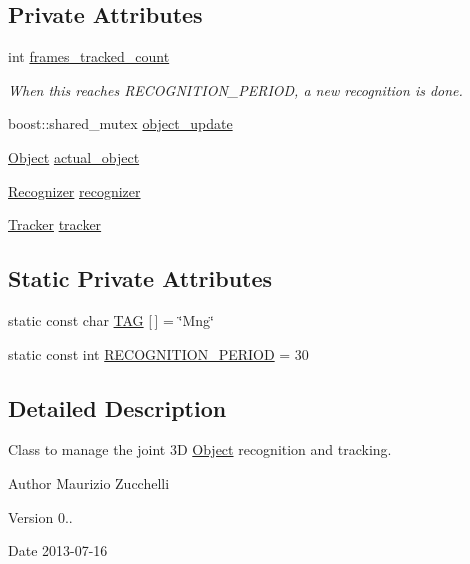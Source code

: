 \subsection*{Private Attributes}
\begin{DoxyCompactItemize}
\item 
int \hyperlink{class_i_stuff_1_1_manager_a3cacb02ece1a4938e7754ad553c91a74}{frames\-\_\-tracked\-\_\-count}
\begin{DoxyCompactList}\small\item\em When this reaches R\-E\-C\-O\-G\-N\-I\-T\-I\-O\-N\-\_\-\-P\-E\-R\-I\-O\-D, a new recognition is done. \end{DoxyCompactList}\item 
boost\-::shared\-\_\-mutex \hyperlink{class_i_stuff_1_1_manager_a9b4234320a01a049bc10f9f13d612fc4}{object\-\_\-update}
\item 
\hyperlink{class_i_stuff_1_1_object}{Object} \hyperlink{class_i_stuff_1_1_manager_a9b898107c919a3ba73f60278c9c05742}{actual\-\_\-object}
\item 
\hyperlink{class_i_stuff_1_1_recognizer}{Recognizer} \hyperlink{class_i_stuff_1_1_manager_ac039aa2e611b04595e4ff69d3534b4cc}{recognizer}
\item 
\hyperlink{class_i_stuff_1_1_tracker}{Tracker} \hyperlink{class_i_stuff_1_1_manager_a3d313f62a1cfe606098fdcb6f1c748ee}{tracker}
\end{DoxyCompactItemize}
\subsection*{Static Private Attributes}
\begin{DoxyCompactItemize}
\item 
static const char \hyperlink{class_i_stuff_1_1_manager_a0228682f317a86ce7057b86e9d229ac6}{T\-A\-G} \mbox{[}$\,$\mbox{]} = \char`\"{}Mng\char`\"{}
\item 
static const int \hyperlink{class_i_stuff_1_1_manager_a58f0beb39eea21e78a8983e5954065c3}{R\-E\-C\-O\-G\-N\-I\-T\-I\-O\-N\-\_\-\-P\-E\-R\-I\-O\-D} = 30
\end{DoxyCompactItemize}


\subsection{Detailed Description}
Class to manage the joint 3\-D \hyperlink{class_i_stuff_1_1_object}{Object} recognition and tracking. 

\begin{DoxyAuthor}{Author}
Maurizio Zucchelli 
\end{DoxyAuthor}
\begin{DoxyVersion}{Version}
0.. 
\end{DoxyVersion}
\begin{DoxyDate}{Date}
2013-\/07-\/16 
\end{DoxyDate}


